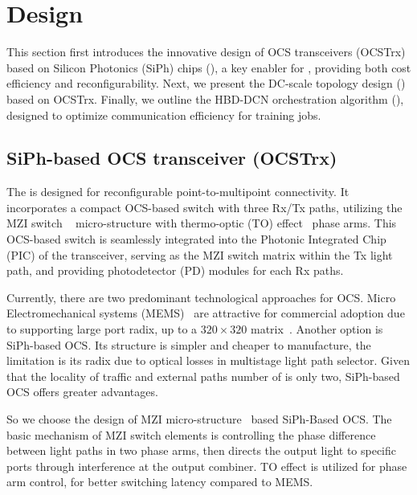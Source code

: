 \vspace{-1em}
\section{\SYS{} Design}
\label{section:design}

This section first introduces the innovative design of OCS transceivers (OCSTrx) based on Silicon Photonics (SiPh) chips (), a key enabler for \sys{}, providing both cost efficiency and reconfigurability. Next, we present the DC-scale \sys{} topology design () based on OCSTrx. Finally, we outline the HBD-DCN orchestration algorithm (), designed to optimize communication efficiency for training jobs.

\vspace{-1em}
\subsection{SiPh-based OCS transceiver (OCSTrx)}
\label{sec:design:docs}

The \ocstrx \xspace is designed for reconfigurable point-to-multipoint connectivity. It incorporates a compact OCS-based switch with three Rx/Tx paths, utilizing the MZI switch ~\cite{mzi} micro-structure with thermo-optic (TO) effect~\cite{thermo-optic_2006} phase arms. This OCS-based switch is seamlessly integrated into the Photonic Integrated Chip (PIC) of the transceiver, serving as the MZI switch matrix within the Tx light path, and providing photodetector (PD) modules for each Rx paths.

Currently, there are two predominant technological approaches for OCS.
Micro Electromechanical systems (MEMS)~\cite{urata2022missionapollo, mem-optical-switches} are attractive for commercial adoption due to supporting large port radix, up to a $320\times 320$ matrix~\cite{mems-320}.
Another option is SiPh-based OCS. 
Its structure is simpler and cheaper to manufacture, the limitation is its radix due to optical losses in multistage light path selector. 
Given that the locality of traffic and external paths number of \ocstrx{} is only two, SiPh-based OCS offers greater advantages. 

So we choose the design of MZI micro-structure~\cite{mzi} based SiPh-Based OCS.
The basic mechanism of MZI switch elements is controlling the phase difference between light paths in two phase arms, then directs the output light to specific ports through interference at the output combiner. TO effect is utilized for phase arm control, for better switching latency compared to MEMS.


